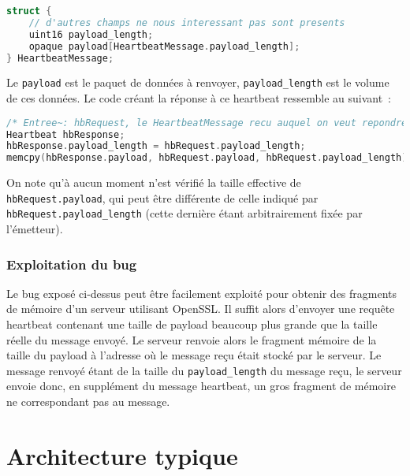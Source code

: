 \documentclass[a4paper,oneside,1pt]{article}
\begin{document}

\begin{lstlisting}[language=C]
struct {
	// d'autres champs ne nous interessant pas sont presents
	uint16 payload_length;
	opaque payload[HeartbeatMessage.payload_length];
} HeartbeatMessage;
\end{lstlisting}

Le \texttt{payload} est le paquet de données à renvoyer, \texttt{payload\_length} est le volume de ces données. Le code créant la réponse à ce heartbeat ressemble au suivant~:

\begin{lstlisting}[language=C]
/* Entree~: hbRequest, le HeartbeatMessage recu auquel on veut repondre */
Heartbeat hbResponse;
hbResponse.payload_length = hbRequest.payload_length;
memcpy(hbResponse.payload, hbRequest.payload, hbRequest.payload_length);
\end{lstlisting}

On note qu'à aucun moment n'est vérifié la taille effective de \texttt{hbRequest.payload}, qui peut être différente de celle indiqué par \texttt{hbRequest.payload\_length} (cette dernière étant arbitrairement fixée par l'émetteur).

\subsubsection{Exploitation du bug}
Le bug exposé ci-dessus peut être facilement exploité pour obtenir des fragments de mémoire d'un serveur utilisant OpenSSL. Il suffit alors d'envoyer une requête heartbeat contenant une taille de payload beaucoup plus grande que la taille réelle du message envoyé. Le serveur renvoie alors le fragment mémoire de la taille du payload à l'adresse où le message reçu était stocké par le serveur. Le message renvoyé étant de la taille du \texttt{payload\_length} du message reçu, le serveur envoie donc, en supplément du message heartbeat, un gros fragment de mémoire ne correspondant pas au message.


\section{Architecture typique}
\end{document}
